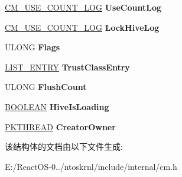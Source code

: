 \begin{DoxyCompactItemize}
\hyperlink{struct___c_m___u_s_e___c_o_u_n_t___l_o_g}{C\+M\+\_\+\+U\+S\+E\+\_\+\+C\+O\+U\+N\+T\+\_\+\+L\+OG} {\bfseries Use\+Count\+Log}
\item 
\mbox{\label{struct___c_m_h_i_v_e_af24f7b9627cd9589f2854f9a01572dfb}} 
\hyperlink{struct___c_m___u_s_e___c_o_u_n_t___l_o_g}{C\+M\+\_\+\+U\+S\+E\+\_\+\+C\+O\+U\+N\+T\+\_\+\+L\+OG} {\bfseries Lock\+Hive\+Log}
\item 
\mbox{\label{struct___c_m_h_i_v_e_a9e02ffa4cd2c1ac988ea74b8a5c63005}} 
U\+L\+O\+NG {\bfseries Flags}
\item 
\mbox{\label{struct___c_m_h_i_v_e_a9981ba9a1435a153a94f85a0493aa331}} 
\hyperlink{struct___l_i_s_t___e_n_t_r_y}{L\+I\+S\+T\+\_\+\+E\+N\+T\+RY} {\bfseries Trust\+Class\+Entry}
\item 
\mbox{\label{struct___c_m_h_i_v_e_a08d286114b6c4a4ae647584d6cb0d11a}} 
U\+L\+O\+NG {\bfseries Flush\+Count}
\item 
\mbox{\label{struct___c_m_h_i_v_e_a1c5e841667cba35f90543357d86b0ca5}} 
\hyperlink{_processor_bind_8h_a112e3146cb38b6ee95e64d85842e380a}{B\+O\+O\+L\+E\+AN} {\bfseries Hive\+Is\+Loading}
\item 
\mbox{\label{struct___c_m_h_i_v_e_a9168b5b432dc1cf04ddecf0d0a75a2ab}} 
\hyperlink{struct___k_t_h_r_e_a_d}{P\+K\+T\+H\+R\+E\+AD} {\bfseries Creator\+Owner}
\end{DoxyCompactItemize}


该结构体的文档由以下文件生成\+:\begin{DoxyCompactItemize}
\item 
E\+:/\+React\+O\+S-\/0../ntoskrnl/include/internal/cm.\+h\end{DoxyCompactItemize}
